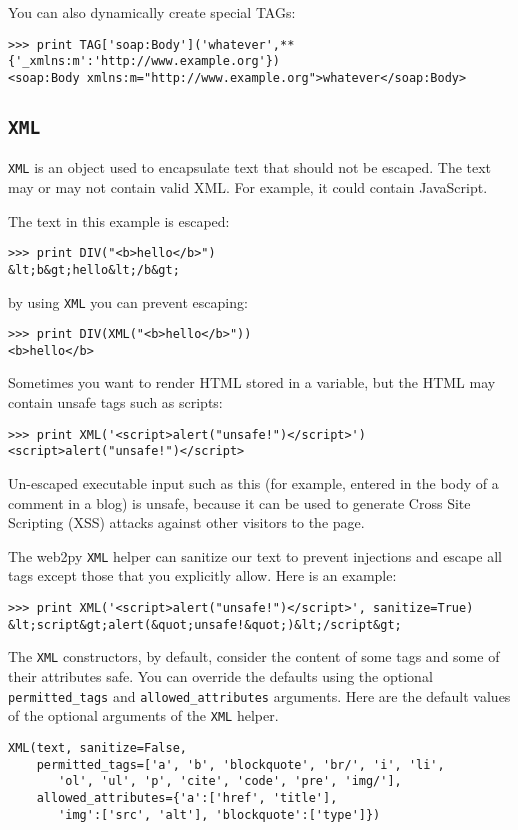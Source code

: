 \documentclass[justified,sixbynine,notoc]{tufte-book}
\def\ft{\small\tt}
\def\inxx#1{\index{#1}}
\begin{document}
\begin{fullwidth}
You can also dynamically create special TAGs:

\begin{lstlisting}
>>> print TAG['soap:Body']('whatever',**{'_xmlns:m':'http://www.example.org'})
<soap:Body xmlns:m="http://www.example.org">whatever</soap:Body>
\end{lstlisting}

\goodbreak\subsection{{\ft XML}}

\inxx{XML}
{\ft XML} is an object used to encapsulate text that should not be escaped. The text may or may not contain valid XML. For example, it could contain JavaScript.

The text in this example is escaped:
\begin{lstlisting}
>>> print DIV("<b>hello</b>")
&lt;b&gt;hello&lt;/b&gt;
\end{lstlisting}
\noindent by using {\ft XML} you can prevent escaping:
\begin{lstlisting}
>>> print DIV(XML("<b>hello</b>"))
<b>hello</b>
\end{lstlisting}

Sometimes you want to render HTML stored in a variable, but the HTML may contain unsafe tags such as scripts:
\begin{lstlisting}
>>> print XML('<script>alert("unsafe!")</script>')
<script>alert("unsafe!")</script>
\end{lstlisting}

Un-escaped executable input such as this (for example, entered in the body of a comment in a blog) is unsafe, because it can be used to generate Cross Site Scripting (XSS) attacks against other visitors to the page.

\inxx{sanitize}
The web2py {\ft XML} helper can sanitize our text to prevent injections and escape all tags except those that you explicitly allow. Here is an example:
\begin{lstlisting}
>>> print XML('<script>alert("unsafe!")</script>', sanitize=True)
&lt;script&gt;alert(&quot;unsafe!&quot;)&lt;/script&gt;
\end{lstlisting}

The {\ft XML} constructors, by default, consider the content of some tags and some of their attributes safe. You can override the defaults using the optional {\ft permitted\_tags} and {\ft allowed\_attributes} arguments. Here are the default values of the optional arguments of the {\ft XML} helper.
\begin{lstlisting}
XML(text, sanitize=False,
    permitted_tags=['a', 'b', 'blockquote', 'br/', 'i', 'li',
       'ol', 'ul', 'p', 'cite', 'code', 'pre', 'img/'],
    allowed_attributes={'a':['href', 'title'],
       'img':['src', 'alt'], 'blockquote':['type']})
\end{lstlisting}


\end{fullwidth}
\end{document}
